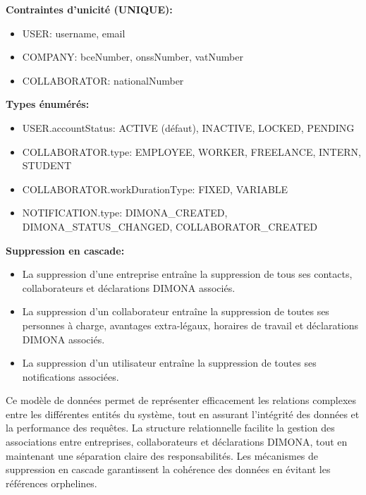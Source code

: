 \vspace{0.5cm}

\textbf{Contraintes d'unicité (UNIQUE):}
\begin{itemize}[leftmargin=*,label=\textcolor{darkgray}{$\bullet$},itemsep=0.3em]
  \item USER: username, email
  \item COMPANY: bceNumber, onssNumber, vatNumber
  \item COLLABORATOR: nationalNumber
\end{itemize}

\vspace{0.5cm}

\textbf{Types énumérés:}
\begin{itemize}[leftmargin=*,label=\textcolor{darkgray}{$\bullet$},itemsep=0.3em]
  \item USER.accountStatus: ACTIVE (défaut), INACTIVE, LOCKED, PENDING
  \item COLLABORATOR.type: EMPLOYEE, WORKER, FREELANCE, INTERN, STUDENT
  \item COLLABORATOR.workDurationType: FIXED, VARIABLE
  \item NOTIFICATION.type: DIMONA\_CREATED, DIMONA\_STATUS\_CHANGED, COLLABORATOR\_CREATED
\end{itemize}

\vspace{0.5cm}

\textbf{Suppression en cascade:}
\begin{itemize}[leftmargin=*,label=\textcolor{darkgray}{$\bullet$},itemsep=0.3em]
  \item La suppression d'une entreprise entraîne la suppression de tous ses contacts, collaborateurs et déclarations DIMONA associés.
  \item La suppression d'un collaborateur entraîne la suppression de toutes ses personnes à charge, avantages extra-légaux, horaires de travail et déclarations DIMONA associés.
  \item La suppression d'un utilisateur entraîne la suppression de toutes ses notifications associées.
\end{itemize}

\vspace{0.5cm}

\begin{tcolorbox}[
  title={\textbf{Modèle de données robuste}},
  colback=blue!5!white,
  colframe=primarycolor,
  fonttitle=\bfseries,
  boxrule=0.5mm,
  arc=2mm,
  left=6mm,
  right=6mm,
  top=6mm,
  bottom=6mm
]
Ce modèle de données permet de représenter efficacement les relations complexes entre les différentes entités du système, tout en assurant l'intégrité des données et la performance des requêtes. La structure relationnelle facilite la gestion des associations entre entreprises, collaborateurs et déclarations DIMONA, tout en maintenant une séparation claire des responsabilités. Les mécanismes de suppression en cascade garantissent la cohérence des données en évitant les références orphelines.
\end{tcolorbox}


